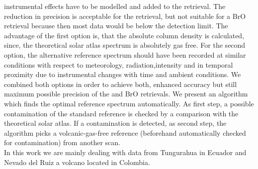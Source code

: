 instrumental effects have to be modelled and added to the retrieval. The reduction in precision is acceptable for the  retrieval, but not suitable for a BrO retrieval because then most data would be below the detection limit. The advantage of the first option is, that the absolute column density is calculated, since, the theoretical solar atlas spectrum is absolutely gas free. For the second option, the alternative reference spectrum should
have been recorded at similar conditions with respect to meteorology,
radiation,intensity and in temporal proximity due to instrumental changes
with time and ambient conditions. We combined both options in order to
achieve both, enhanced accuracy but still maximum possible precision of
the  and BrO retrievals. We present an algorithm which finds the
optimal reference spectrum automatically. As first step, a possible 
contamination of the standard reference is checked by a comparison with
the theoretical solar atlas. If a contamination is detected, as second step,
the algorithm picks a volcanic-gas-free reference (beforehand
automatically checked for contamination) from another scan.\\
%
\newline
%
In this work we are mainly dealing with data from Tungurahua in Ecuador and Nevado del Ruiz a volcano located in Colombia.